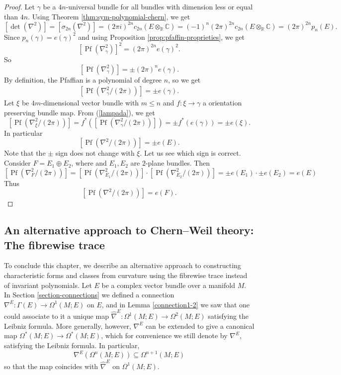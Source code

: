 \documentclass[a4paper,openany]{scrbook}
\begin{document}
\begin{proof}
    Let $\gamma$ be a $4n$-universal bundle for all bundles with dimension less or equal than $4n$. Using Theorem \ref{thm:sym-polynomial-chern}, we get
    $$[\det(\nabla^2)] = [\sigma_{2n}(\nabla^2)] = (2\pi i)^{2n}c_{2n}(E \otimes_{\mathbb{R}} \mathbb{C}) = (-1)^n(2\pi)^{2n}c_{2n}(E \otimes_{\mathbb{R}} \mathbb{C}) = (2\pi)^{2n}p_n(E).$$
    Since $p_n(\gamma) = e(\gamma)^2$ and using Proposition \ref{prop:pfaffin-proprieties}, we get
    $$[\operatorname{Pf}(\nabla_\gamma^2)]^2 = (2\pi)^{2n}e(\gamma)^2.$$
    So
    $$[\operatorname{Pf}(\nabla_\gamma^2)] = \pm (2\pi)^{n}e(\gamma). $$
    By definition, the Pfaffian is a polynomial of degree $n$, so we get
    \begin{align}
    \label{lampada}
       [\operatorname{Pf}(\nabla_\gamma^2/(2\pi))] = \pm e(\gamma).
    \end{align}
    Let $\xi$ be $4m$-dimensional vector bundle with $m \leq n$ and $f:\xi \rightarrow \gamma$ a orientation preserving bundle map. From (\ref{lampada}), we get
    $$[\operatorname{Pf}(\nabla_\xi^2/(2\pi))] = f^*([\operatorname{Pf}(\nabla_\gamma^2/(2\pi))]) = \pm f^*(e(\gamma)) = \pm e(\xi).$$
    In particular 
    $$[\operatorname{Pf}(\nabla^2/(2\pi))] = \pm e(E).$$
    Note that the $\pm$ sign does not change with $\xi$. Let us see which sign is correct. Consider $F= E_1 \oplus E_2$, where and $E_1,E_2$ are $2$-plane bundles. Then
    $$[\operatorname{Pf}(\nabla_F^2/(2\pi))] = [\operatorname{Pf}(\nabla_{E_1}^2/(2\pi))] \cdot [\operatorname{Pf}(\nabla_{E_2}^2/(2\pi))] = \pm e(E_1)\cdot \pm e(E_2) = e(E)$$
    Thus 
    $$[\operatorname{Pf}(\nabla^2/(2\pi))] = e(F).$$
\end{proof}



\subsection{An alternative approach to Chern--Weil theory: The fibrewise trace}

To conclude this chapter, we describe an alternative approach to constructing characteristic forms and classes from curvature using the fibrewise trace instead of invariant polynomials. Let $E$ be a complex vector bundle over a manifold $M$. In Section \ref{section-connections} we defined a connection $\nabla^E:\Gamma(E)\to\Omega^1(M;E)$ on $E$, and in Lemma \ref{connection1-2} we saw that one could associate to it a unique map $\hat{\nabla}^E:\Omega^1(M;E)\to\Omega^2(M;E)$ satisfying the Leibniz formula. More generally, however, $\nabla^E$ can be extended to give a canonical map $\Omega^*(M;E)\to\Omega^*(M;E)$, which for convenience we still denote by $\nabla^E$, satisfying the Leibniz formula. In particular,
\begin{equation*}
\nabla^E(\Omega^n(M;E))\subseteq\Omega^{n+1}(M;E)
\end{equation*}
so that the map coincides with $\hat{\nabla}^E$ on $\Omega^1(M;E)$.
\end{document}
